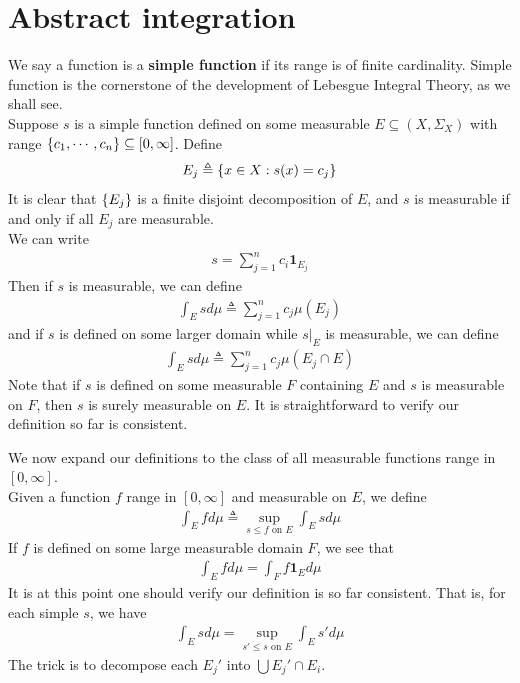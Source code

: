 \documentclass{report}
\begin{document}
\section{Abstract integration} 
\begin{mdframed}
We say a function is a \textbf{simple function} if its range is of finite cardinality. Simple function is the cornerstone of the development of Lebesgue Integral Theory, as we shall see.\\

Suppose $s$ is a simple function defined on some measurable $E\subseteq (X,\Sigma_X)$ with range $\{ c_1,\cdots ,c_n \}\subseteq [0,\infty]$. Define 
\begin{align*}
E_j\triangleq \{ x \in X: s(x)=c_j \}
\end{align*}
It is clear that $\{ E_j \}$ is a finite disjoint decomposition of $E$, and $s$ is measurable if and only if all $E_j$ are measurable.\\

We can write
\begin{align*}
s= \sum_{j=1}^n c_i \textbf{1}_{E_j}
\end{align*}
Then if $s$ is measurable, we can define
\begin{align*}
\int_E s d\mu \triangleq \sum_{j=1}^n c_j \mu (E_j)
\end{align*}
and if $s$ is defined on some larger domain while $s|_E$ is measurable, we can define 
\begin{align*}
\int_E s d\mu \triangleq \sum_{j=1}^n c_j\mu (E_j\cap E)
\end{align*}
Note that if $s$ is defined on some measurable $F$ containing  $E$ and  $s$ is measurable on $F$, then $s$ is surely measurable on $E$. It is straightforward to verify our definition so far is consistent.
\end{mdframed}


\begin{mdframed}
We now expand our definitions to the class of all measurable functions range in $[0,\infty]$.\\

Given a function $f$ range in $[0,\infty]$ and measurable on $E$, we define 
\begin{align*}
\int_E fd\mu \triangleq \sup_{s\leq f\text{ on }E} \int_E s d\mu
\end{align*}
If $f$ is defined on some large measurable domain $F$, we see that 
 \begin{align*}
\int_Efd\mu= \int_F f\textbf{1}_Ed\mu
\end{align*}
It is at this point one should verify our definition is so far consistent. That is, for each simple $s$, we have 
\begin{align*}
\int_Esd\mu=\sup_{s'\leq s\text{ on }E}\int_Es'd\mu
\end{align*}
The trick is to decompose each $E_j'$ into $\bigcup E_j'\cap E_i$. 
\end{mdframed}
\end{document}
